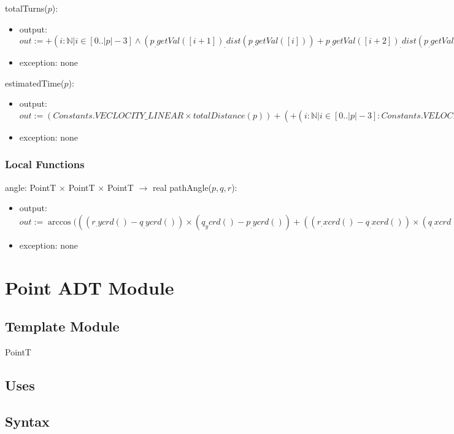 \documentclass[12pt]{article}
\begin{document}
\noindent totalTurns($p$):
\begin{itemize}
\item output: $\mathit{out} := + ( i: \mathbb{N}  |  i \in [0 ..  |p|-3] \land (p_.getVal([i+1])_.dist(p_.getVal([i])) + p_.getVal([i+2])_.dist(p_.getVal([i+1]))) \neq p_.getVal([i+2])_.dist(p_.getVal([i])) : 1 )$
\item exception: none
\end{itemize}

\noindent estimatedTime($p$):
\begin{itemize}
\item output: $\mathit{out} := (Constants.VECLOCITY\_LINEAR \times totalDistance(p)) + ( + ( i: \mathbb{N} | i \in [0 .. |p|-3] : Constants.VELOCITY\_ANGULAR \times pathAngle(p_.getVal(i), p_.getVal(i+1), p_.getVal(i+2))))$
\item exception: none
\end{itemize}
    
\subsubsection*{Local Functions}
angle: PointT $\times$ PointT  $\times$ PointT  $\rightarrow$  real
\noindent pathAngle($p, q, r$):
\begin{itemize}
\item output: $\mathit{out} := \arccos (((r_.ycrd() - q_.ycrd()) \times (q_ycrd() - p_.ycrd()) + ((r_.xcrd() - q_.xcrd()) \times (q_.xcrd() - p_.xcrd())) / (r_.dist(q) \times q_.dist(p)))$
\item exception: none
\end{itemize}

\newpage

\section* {Point ADT Module}

\subsection*{Template Module}

PointT

\subsection* {Uses}



\subsection* {Syntax}
\end{document}
